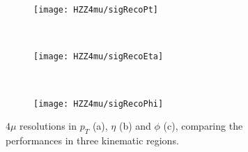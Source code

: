 \documentclass[a4paper,twoside,12pt]{book}
\begin{document}
\begin{figure}
\begin{subfigure}{\linewidth}
\centering
\texttt{[image: HZZ4mu/sigRecoPt]}
\caption{}
\label{fig:HZZ4mu:sigRecoPt}
\end{subfigure}\\[1ex]
\begin{subfigure}{\linewidth}
\centering
\texttt{[image: HZZ4mu/sigRecoEta]}
\caption{}
\label{fig:HZZ4mu:sigRecoEta}
\end{subfigure}\\[1ex]
\begin{subfigure}{\linewidth}
\centering
\texttt{[image: HZZ4mu/sigRecoPhi]}
\caption{}
\label{fig:HZZ4mu:sigRecoPhi}
\end{subfigure}
\caption{$4\mu$ resolutions in $p_{T}$ (a), $\eta$ (b) and $\phi$ (c), comparing
	the performances in three kinematic regions.}
\label{fig:HZZ4mu:sigRecoPtEtaPhi}
\end{figure}
\end{document}
